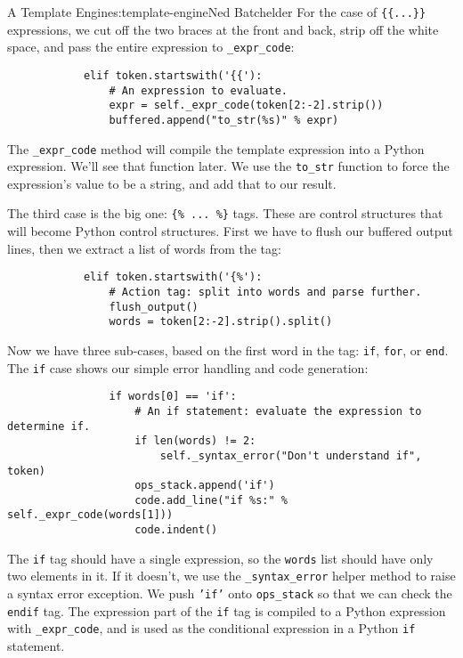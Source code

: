 \begin{aosachapter}{A Template Engine}{s:template-engine}{Ned Batchelder}
For the case of \texttt{\{\{...\}\}} expressions, we cut off the two
braces at the front and back, strip off the white space, and pass the
entire expression to \texttt{\_expr\_code}:

\begin{verbatim}
            elif token.startswith('{{'):
                # An expression to evaluate.
                expr = self._expr_code(token[2:-2].strip())
                buffered.append("to_str(%s)" % expr)
\end{verbatim}

The \texttt{\_expr\_code} method will compile the template expression
into a Python expression. We'll see that function later. We use the
\texttt{to\_str} function to force the expression's value to be a
string, and add that to our result.

The third case is the big one: \texttt{\{\% ... \%\}} tags. These are
control structures that will become Python control structures. First we
have to flush our buffered output lines, then we extract a list of words
from the tag:

\begin{verbatim}
            elif token.startswith('{%'):
                # Action tag: split into words and parse further.
                flush_output()
                words = token[2:-2].strip().split()
\end{verbatim}

Now we have three sub-cases, based on the first word in the tag:
\texttt{if}, \texttt{for}, or \texttt{end}. The \texttt{if} case shows
our simple error handling and code generation:

\begin{verbatim}
                if words[0] == 'if':
                    # An if statement: evaluate the expression to determine if.
                    if len(words) != 2:
                        self._syntax_error("Don't understand if", token)
                    ops_stack.append('if')
                    code.add_line("if %s:" % self._expr_code(words[1]))
                    code.indent()
\end{verbatim}

The \texttt{if} tag should have a single expression, so the
\texttt{words} list should have only two elements in it. If it doesn't,
we use the \texttt{\_syntax\_error} helper method to raise a syntax
error exception. We push \texttt{'if'} onto \texttt{ops\_stack} so that
we can check the \texttt{endif} tag. The expression part of the
\texttt{if} tag is compiled to a Python expression with
\texttt{\_expr\_code}, and is used as the conditional expression in a
Python \texttt{if} statement.


\end{aosachapter}
